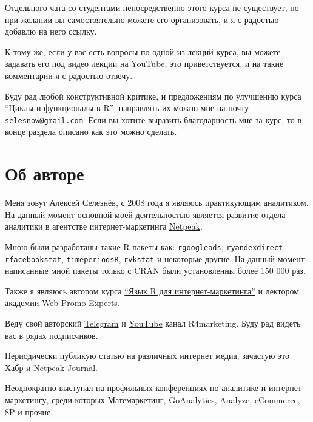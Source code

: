 \documentclass[
]{book}
\begin{document}
Отдельного чата со студентами непосредственно этого курса не существует, но при желании вы самостоятельно можете его организовать, и я с радостью добавлю на него ссылку.

К тому же, если у вас есть вопросы по одной из лекций курса, вы можете задавать его под видео лекции на YouTube, это приветствуется, и на такие комментарии я с радостью отвечу.

Буду рад любой конструктивной критике, и предложениям по улучшению курса ``Циклы и функционалы в R'', направлять их можно мне на почту \href{mailto:selesnow@gmail.com}{\nolinkurl{selesnow@gmail.com}}. Если вы хотите выразить благодарность мне за курс, то в конце раздела описано как это можно сделать.

\hypertarget{ux43eux431-ux430ux432ux442ux43eux440ux435}{%
\section*{Об авторе}\label{ux43eux431-ux430ux432ux442ux43eux440ux435}}

Меня зовут Алексей Селезнёв, с 2008 года я являюсь практикующим аналитиком. На данный момент основной моей деятельностью является развитие отдела аналитики в агентстве интернет-маркетинга \href{https://https://netpeak.group/}{Netpeak}.

Мною были разработаны такие R пакеты как: \texttt{rgoogleads}, \texttt{ryandexdirect}, \texttt{rfacebookstat}, \texttt{timeperiodsR}, \texttt{rvkstat} и некоторые другие. На данный момент написанные мной пакеты только с CRAN были установленны более 150 000 раз.

Также я являюсь автором курса \href{https://needfordata.ru/r}{``Язык R для интернет-маркетинга''} и лектором академии \href{https://webpromoexperts.net/}{Web Promo Experts}.

Веду свой авторский \href{https://t.me/R4marketing}{Telegram} и \href{https://www.youtube.com/R4marketing/?sub_confirmation=1}{YouTube} канал R4marketing. Буду рад видеть вас в рядах подписчиков.

Периодически публикую статью на различных интернет медиа, зачастую это \href{https://habr.com/ru/users/selesnow/}{Хабр} и \href{https://netpeak.net/ru/blog/user/publication/826/}{Netpeak Journal}.

Неоднократно выступал на профильных конференциях по аналитике и интернет маркетингу, среди которых Матемаркетинг, GoAnalytics, Analyze, eCommerce, 8P и прочие.
\end{document}
